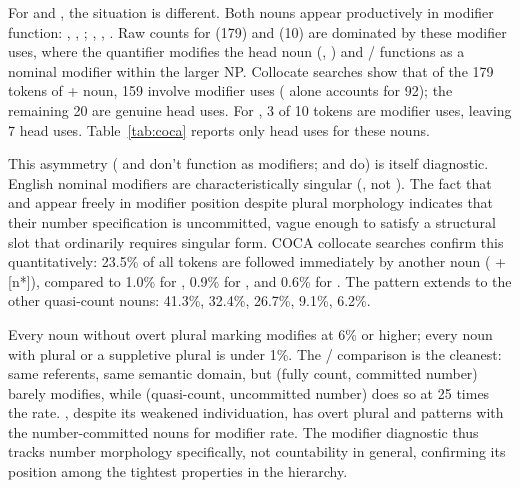 \documentclass[12pt,a4paper]{article}
\begin{document}
For  and , the situation is different. Both nouns appear productively in modifier function: , , ; , , . Raw counts for  (179) and  (10) are dominated by these modifier uses, where the quantifier modifies the head noun (, ) and / functions as a nominal modifier within the larger NP. Collocate searches show that of the 179 tokens of  + noun, 159 involve modifier uses ( alone accounts for 92); the remaining 20 are genuine head uses. For , 3 of 10  tokens are modifier uses, leaving 7 head uses. Table~\ref{tab:coca} reports only head uses for these nouns.

This asymmetry ( and  don't function as modifiers;  and  do) is itself diagnostic. English nominal modifiers are characteristically singular (, not ). The fact that  and  appear freely in modifier position despite plural morphology indicates that their number specification is uncommitted, vague enough to satisfy a structural slot that ordinarily requires singular form. COCA collocate searches confirm this quantitatively: 23.5\% of all  tokens are followed immediately by another noun ( + [n*]), compared to 1.0\% for , 0.9\% for , and 0.6\% for . The pattern extends to the other quasi-count nouns:  41.3\%,  32.4\%,  26.7\%,  9.1\%,  6.2\%.

Every noun without overt plural marking modifies at 6\% or higher; every noun with plural  or a suppletive plural is under 1\%. The / comparison is the cleanest: same referents, same semantic domain, but  (fully count, committed number) barely modifies, while  (quasi-count, uncommitted number) does so at 25 times the rate. , despite its weakened individuation, has overt plural  and patterns with the number-committed nouns for modifier rate. The modifier diagnostic thus tracks number morphology specifically, not countability in general, confirming its position among the tightest properties in the hierarchy.
\end{document}
